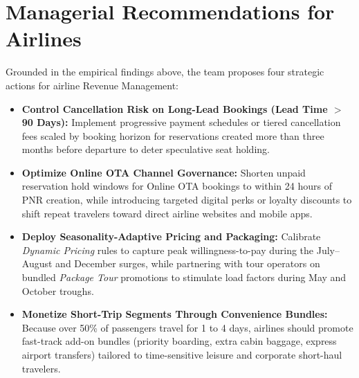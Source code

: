 \documentclass[12pt, a4paper]{report}
\begin{document}
\section{Managerial Recommendations for Airlines}

Grounded in the empirical findings above, the team proposes four strategic actions for airline Revenue Management:

\begin{itemize}
  \item \textbf{Control Cancellation Risk on Long-Lead Bookings (Lead Time $>$ 90 Days):} Implement progressive payment schedules or tiered cancellation fees scaled by booking horizon for reservations created more than three months before departure to deter speculative seat holding.
  \item \textbf{Optimize Online OTA Channel Governance:} Shorten unpaid reservation hold windows for Online OTA bookings to within 24 hours of PNR creation, while introducing targeted digital perks or loyalty discounts to shift repeat travelers toward direct airline websites and mobile apps.
  \item \textbf{Deploy Seasonality-Adaptive Pricing and Packaging:} Calibrate \textit{Dynamic Pricing} rules to capture peak willingness-to-pay during the July--August and December surges, while partnering with tour operators on bundled \textit{Package Tour} promotions to stimulate load factors during May and October troughs.
  \item \textbf{Monetize Short-Trip Segments Through Convenience Bundles:} Because over 50\% of passengers travel for 1 to 4 days, airlines should promote fast-track add-on bundles (priority boarding, extra cabin baggage, express airport transfers) tailored to time-sensitive leisure and corporate short-haul travelers.
\end{itemize}

\end{document}
